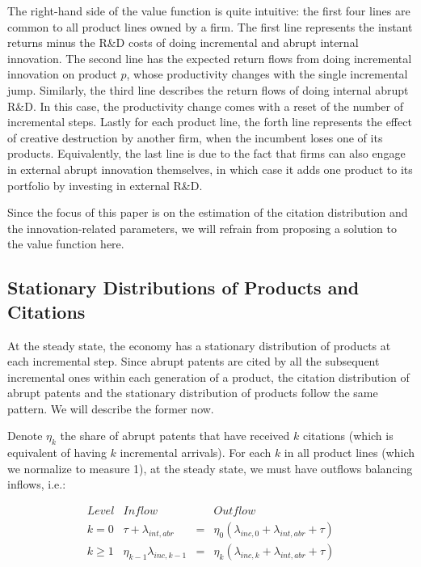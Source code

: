 \documentclass[letterpaper,12pt]{article}
\theoremstyle{definition}
\begin{document}
The right-hand side of the value function is quite intuitive: the first four lines are common to all product lines owned by a firm. The first line represents the instant returns minus the R\&D costs of doing incremental and abrupt internal innovation. The second line has the expected return flows from doing incremental innovation on product $p$, whose productivity changes with the single incremental jump. Similarly, the third line describes the return flows of doing internal abrupt R\&D. In this case, the productivity change comes with a reset of the number of incremental steps. Lastly for each product line, the forth line represents the effect of creative destruction by another firm, when the incumbent loses one of its products. Equivalently, the last line is due to the fact that firms can also engage in external abrupt innovation themselves, in which case it adds one product to its portfolio by investing in external R\&D.

Since the focus of this paper is on the estimation of the citation distribution and the innovation-related parameters, we will refrain from proposing a solution to the value function here.

\subsection{Stationary Distributions of Products and Citations}

At the steady state, the economy has a stationary distribution of products at each incremental step. Since abrupt patents are cited by all the subsequent incremental ones within each generation of a product, the citation distribution of abrupt patents and the stationary distribution of products follow the same pattern. We will describe the former now.

Denote $\eta_k$ the share of abrupt patents that have received $k$ citations (which is equivalent of having $k$ incremental arrivals). For each $k$ in all product lines (which we normalize to measure 1), at the steady state, we must have outflows balancing inflows, i.e.:

$$\begin{array}{llll}
\textit{Level} & \textit{Inflow} &  & \textit{Outflow}\\
k = 0 & \tau + \lambda_{int,abr} & = & \eta_0(\lambda_{inc,0} + \lambda_{int,abr} + \tau)\\
k \geq 1 & \eta_{k-1}\lambda_{inc,k-1} & = & \eta_k(\lambda_{inc,k} + \lambda_{int,abr} + \tau)\\
\end{array}$$
\end{document}
